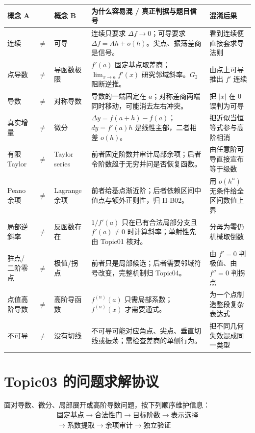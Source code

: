 \documentclass[11pt,a4paper]{ctexart}
\begin{document}
\begin{longtable}{L{1.95cm}@{}>{\centering\arraybackslash}p{0.35cm}@{}L{1.95cm}L{5.55cm}L{\dimexpr\linewidth-10.45cm\relax}}
\toprule
\textbf{概念 A} & & \textbf{概念 B} & \textbf{为什么容易混 / 真正判据与题目信号} & \textbf{混淆后果}\\
\midrule
连续 & $\neq$ & 可导 & 连续只要求 $\Delta f\to0$；可导要求 $\Delta f=Ah+o(h)$。尖点、振荡差商是信号。 & 看到连续便直接套求导法则\\
点导数 & $\neq$ & 导函数极限 & $f'(a)$ 固定基点取差商；$\lim_{x\to a}f'(x)$ 研究邻域斜率。$G_2$ 阻断逆推。 & 由点上可导推出 $f'$ 连续\\
导数 & $\neq$ & 对称导数 & 导数的一端固定在 $a$；对称差商两端同时移动，可能消去左右冲突。 & 把 $\lvert x\rvert$ 在 $0$ 误判为可导\\
真实增量 & $\neq$ & 微分 & $\Delta y=f(a+h)-f(a)$；$dy=f'(a)h$ 是线性主部，二者相差 $o(h)$。 & 把近似当恒等式参与高阶相消\\
有限 Taylor & $\neq$ & Taylor series & 前者固定阶数并审计局部余项；后者令阶数趋于无穷并问是否恢复函数。 & 由任意阶可导直接宣布等于级数\\
Peano 余项 & $\neq$ & Lagrange 余项 & 前者给基点渐近阶；后者依赖区间中值点与额外正则性，归 H-B02。 & 用 $o(h^n)$ 无条件给全区间数值上界\\
局部逆斜率 & $\neq$ & 反函数存在 & $1/f'(a)$ 只在已有合法局部分支且 $f'(a)\ne0$ 时计算斜率；单射性先由 Topic01 核对。 & 分母为零仍机械取倒数\\
驻点/二阶零点 & $\neq$ & 极值/拐点 & 前者只是局部候选；后者需要邻域符号改变，完整机制归 Topic04。 & 由 $f'=0$ 判极值、由 $f''=0$ 判拐点\\
点值高阶导数 & $\neq$ & 高阶导函数 & $f^{(n)}(a)$ 只需局部系数；$f^{(n)}(x)$ 才需要通式。 & 为一个点制造整段复杂表达式\\
不可导 & $\neq$ & 没有切线 & 不可导可能对应角点、尖点、垂直切线或振荡；需检查差商的单侧行为。 & 把不同几何失效混成同一类型\\
\bottomrule
\end{longtable}

\section{Topic03 的问题求解协议}

面对导数、微分、局部展开或高阶导数问题，按下列顺序维护信息：
\[
\boxed{
\begin{gathered}
\text{固定基点}\to\text{合法性门}\to\text{目标阶数}\to\text{表示选择}\\
\to\text{系数提取}\to\text{余项审计}\to\text{独立验证}
\end{gathered}}
\]
\end{document}
